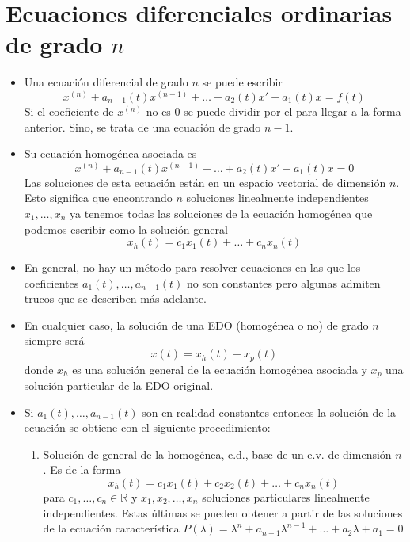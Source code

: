 \newcommand{\R}{\mathbb{R}}
\renewcommand{\Re}{\operatorname{Re}}
\renewcommand{\Im}{\operatorname{Im}}
\newcommand{\A}{\mathbb{A}}

\hypertarget{ecuaciones-diferenciales-ordinarias-de-grado-n}{%
\section{\texorpdfstring{Ecuaciones diferenciales ordinarias de grado
\(n\)}{Ecuaciones diferenciales ordinarias de grado n}}\label{ecuaciones-diferenciales-ordinarias-de-grado-n}}

\begin{itemize}
\item
  Una ecuación diferencial de grado \(n\) se puede escribir
  \[x^{(n)} + a_{n-1}(t)x^{(n-1)} + \dots  + a_2(t)x'  + a_1(t) x = f(t)\]
  Si el coeficiente de \(x^{(n)}\) no es \(0\) se puede dividir por el
  para llegar a la forma anterior. Sino, se trata de una ecuación de
  grado \(n-1\).
\item
  Su ecuación homogénea asociada es
  \[x^{(n)} + a_{n-1}(t)x^{(n-1)} + \dots  + a_2(t)x' + a_1(t) x = 0\]
  Las soluciones de esta ecuación están en un espacio vectorial de
  dimensión \(n\). Esto significa que encontrando \(n\) soluciones
  linealmente independientes \(x_1, \dots, x_n\) ya tenemos todas las
  soluciones de la ecuación homogénea que podemos escribir como la
  solución general \[x_h(t) = c_1 x_1(t) + \dots + c_n x_n(t)\]
\item
  En general, no hay un método para resolver ecuaciones en las que los
  coeficientes \(a_1(t), \dots, a_{n-1}(t)\) no son constantes pero
  algunas admiten trucos que se describen más adelante.
\item
  En cualquier caso, la solución de una EDO (homogénea o no) de grado
  \(n\) siempre será \[ x(t) = x_h(t) + x_p(t)\] donde \(x_h\) es una
  solución general de la ecuación homogénea asociada y \(x_p\) una
  solución particular de la EDO original.
\item
  Si \(a_1(t), \dots, a_{n-1}(t)\) son en realidad constantes entonces
  la solución de la ecuación se obtiene con el siguiente procedimiento:

  \begin{enumerate}
  \def\labelenumi{\arabic{enumi}.}
  \item
    Solución de general de la homogénea, e.d., base de un e.v. de
    dimensión \(n\). Es de la forma
    \[x_h(t) = c_1 x_1(t) + c_2 x_2(t) + \dots + c_n x_n(t)\] para
    \(c_1, \dots, c_n \in \mathbb{R}\) y \(x_1, x_2, \dots, x_n\)
    soluciones particulares linealmente independientes. Estas últimas se
    pueden obtener a partir de las soluciones de la ecuación
    característica
    \(P(\lambda) = \lambda^n + a_{n-1}\lambda^{n-1} + \dots + a_2 \lambda + a_1 = 0\)


\end{enumerate}
\end{itemize}
